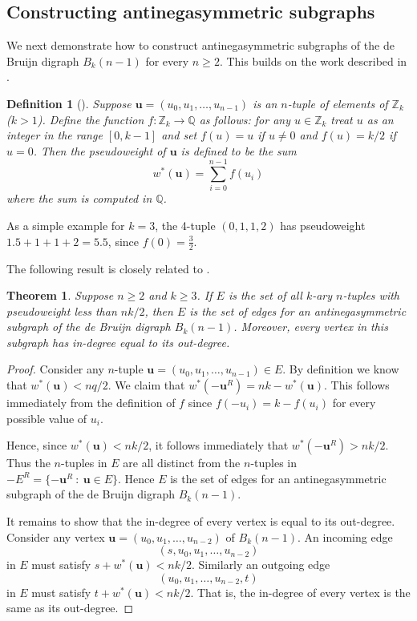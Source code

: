 \documentclass[a4paper,11pt]{article}
\newtheorem{theorem}[lemma]{Theorem}
\newtheorem{definition}[lemma]{Definition}
\begin{document}
\subsection{Constructing antinegasymmetric subgraphs}

We next demonstrate how to construct antinegasymmetric subgraphs of the de Bruijn digraph
$B_{k}(n-1)$ for every $n\geq2$.  This builds on the work described in \cite{Mitchell25a}.

\begin{definition}[\cite{Mitchell25a}]  \label{definition:pseudoweight}
Suppose $\mathbf{u}=(u_0,u_1,\ldots,u_{n-1})$ is an $n$-tuple of elements of $\mathbb{Z}_k$
($k>1$). Define the function $f:\mathbb{Z}_k\rightarrow\mathbb{Q}$ as follows: for any
$u\in\mathbb{Z}_k$ treat $u$ as an integer in the range $[0,k-1]$ and set $f(u)=u$ if $u\neq0$ and
$f(u)=k/2$ if $u=0$. Then the \emph{pseudoweight} of $\mathbf{u}$ is defined to be the sum
\[ w^*(\mathbf{u}) = \sum_{i=0}^{n-1}f(u_i) \]
where the sum is computed in $\mathbb{Q}$.
\end{definition}

As a simple example for $k=3$, the 4-tuple $(0,1,1,2)$ has pseudoweight $1.5+1+1+2=5.5$, since
$f(0)=\frac{3}{2}$.

The following result is closely related to \cite[Theorem 3.14]{Mitchell25a}.

\begin{theorem}  \label{theorem:pseudoweight}
Suppose $n\geq2$ and $k\geq3$. If $E$ is the set of all $k$-ary $n$-tuples with pseudoweight less
than $nk/2$, then $E$ is the set of edges for an antinegasymmetric subgraph of the de Bruijn
digraph $B_{k}(n-1)$. Moreover, every vertex in this subgraph has in-degree equal to its
out-degree.
\end{theorem}

\begin{proof}
Consider any $n$-tuple $\mathbf{u}=(u_0,u_1,\ldots,u_{n-1})\in E$.  By definition we know that
$w^*(\mathbf{u})<nq/2$. We claim that $w^*(-\mathbf{u}^R)=nk-w^*(\mathbf{u})$. This follows
immediately from the definition of $f$ since $f(-u_i)=k-f(u_i)$ for every possible value of $u_i$.

Hence, since $w^*(\mathbf{u})<nk/2$, it follows immediately that $w^*(-\mathbf{u}^R)>nk/2$.  Thus
the $n$-tuples in $E$ are all distinct from the $n$-tuples in
$-E^R=\{-\mathbf{u}^R~:~\mathbf{u}\in
E\}$. Hence $E$ is the set of edges for an antinegasymmetric subgraph of the de Bruijn digraph
$B_{k}(n-1)$.

It remains to show that the in-degree of every vertex is equal to its out-degree. Consider any
vertex $\mathbf{u}=(u_0,u_1,\ldots,u_{n-2})$ of $B_{k}(n-1)$. An incoming edge
\[ (s,u_0,u_1,\ldots,u_{n-2}) \] in $E$
must satisfy $s+w^*(\mathbf{u})<nk/2$. Similarly an outgoing edge
\[(u_0,u_1,\ldots,u_{n-2},t)\]
in $E$ must satisfy $t+w^*(\mathbf{u})<nk/2$.  That is, the in-degree of every vertex is the same
as its out-degree.
\end{proof}
\end{document}
